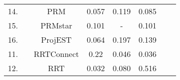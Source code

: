 \begin{table}[H]
\begin{tabular}{|c|c|c|c|c|c|ll}
\cellcolor[HTML]{C0C0C0}14.  &                                                                                                                                & \cellcolor[HTML]{C0C0C0}PRM         & \cellcolor[HTML]{C0C0C0}0.057                                                                  & \cellcolor[HTML]{C0C0C0}0.119                                                                  & \cellcolor[HTML]{C0C0C0}0.085                                                                  &  &  \\ \cline{1-1} \cline{3-6}
\cellcolor[HTML]{EFEFEF}15.  &                                                                                                                                & \cellcolor[HTML]{EFEFEF}PRMstar     & \cellcolor[HTML]{EFEFEF}0.101                                                                  & \cellcolor[HTML]{EFEFEF}-                                                                      & \cellcolor[HTML]{EFEFEF}0.101                                                                  &  &  \\ \cline{1-1} \cline{3-6}
\cellcolor[HTML]{C0C0C0}16.  &                                                                                                                                & \cellcolor[HTML]{C0C0C0}ProjEST     & \cellcolor[HTML]{C0C0C0}0.064                                                                  & \cellcolor[HTML]{C0C0C0}0.197                                                                  & \cellcolor[HTML]{C0C0C0}0.139                                                                  &  &  \\ \cline{1-1} \cline{3-6}
\cellcolor[HTML]{9AFF99}11.  &                                                                                                                                & \cellcolor[HTML]{9AFF99}RRTConnect  & \cellcolor[HTML]{9AFF99}0.22                                                                   & \cellcolor[HTML]{9AFF99}0.046                                                                  & \cellcolor[HTML]{9AFF99}0.036                                                                  &  &  \\ \cline{1-1} \cline{3-6}
\cellcolor[HTML]{C0C0C0}12.  &                                                                                                                                & \cellcolor[HTML]{C0C0C0}RRT         & \cellcolor[HTML]{C0C0C0}0.032                                                                  & \cellcolor[HTML]{C0C0C0}0.080                                                                  & \cellcolor[HTML]{C0C0C0}0.516                                                                  &  &  \\ \cline{1-1} \cline{3-6}

\end{tabular}
\end{table}
